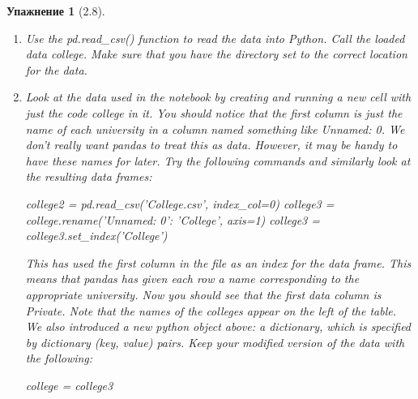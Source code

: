 \documentclass{article}
\newtheorem{exercise}[subsubsection]{Упажнение}
\begin{document}
\begin{exercise}[2.8]
\begin{enumerate}[label=(\alph*)]
		\item  Use the pd.read\_csv() function to read the data into Python. Call
		the loaded data college. Make sure that you have the directory
		set to the correct location for the data.
		\item Look at the data used in the notebook by creating and running
		a new cell with just the code college in it. You should notice
		that the first column is just the name of each university in a
		column named something like Unnamed: 0. We don’t really want
		pandas to treat this as data. However, it may be handy to have
		these names for later. Try the following commands and similarly
		look at the resulting data frames:
		\begin{python}[language=Python]
college2 = pd.read_csv('College.csv', index_col=0)
college3 = college.rename({'Unnamed: 0': 'College'},
													axis=1)
college3 = college3.set_index('College')
	\end{python}		
This has used the first column in the file as an index for the
data frame. This means that pandas has given each row a name
corresponding to the appropriate university. Now you should see
that the first data column is Private. Note that the names of
the colleges appear on the left of the table. We also introduced
a new python object above: a dictionary, which is specified by dictionary
(key, value) pairs. Keep your modified version of the data with
the following:
\begin{python}
	college = college3
\end{python}


\end{enumerate}
\end{exercise}
\end{document}
